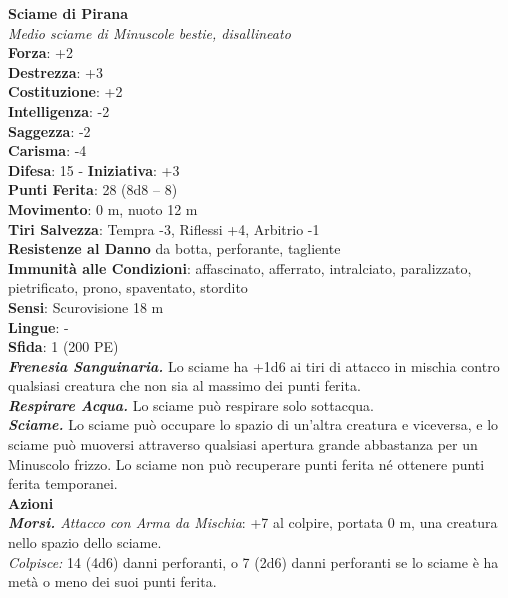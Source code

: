 \begin{multicols}{2}
\medskip\textbf{Sciame di Pirana}\\
\emph{Medio sciame di Minuscole bestie, disallineato}\\
\textbf{Forza}: +2\\
\textbf{Destrezza}: +3\\
\textbf{Costituzione}: +2\\
\textbf{Intelligenza}: -2\\
\textbf{Saggezza}: -2\\
\textbf{Carisma}: -4\\
\textbf{Difesa}: 15 - \textbf{Iniziativa}: +3\\
\textbf{Punti Ferita}: 28 (8d8 -- 8)\\
\textbf{Movimento}: 0 m, nuoto 12 m\\
\textbf{Tiri Salvezza}: Tempra -3, Riflessi +4, Arbitrio -1\\
\textbf{Resistenze al Danno} da botta, perforante, tagliente\\
\textbf{Immunità alle Condizioni}: affascinato, afferrato, intralciato, paralizzato, pietrificato, prono, spaventato, stordito\\
\textbf{Sensi}: Scurovisione 18 m\\
\textbf{Lingue}: -\\
\textbf{Sfida}: 1 (200 PE)\smallskip\\
\emph{\textbf{Frenesia Sanguinaria.}} Lo sciame ha +1d6 ai tiri di attacco in mischia contro qualsiasi creatura che non sia al massimo dei punti ferita.\\
\emph{\textbf{Respirare Acqua.}} Lo sciame può respirare solo sottacqua.\\
\emph{\textbf{Sciame.}} Lo sciame può occupare lo spazio di un'altra creatura e viceversa, e lo sciame può muoversi attraverso qualsiasi apertura grande abbastanza per un Minuscolo frizzo. Lo sciame non può recuperare punti ferita né ottenere punti ferita temporanei.\\
\smallskip\textbf{Azioni}\\
\emph{\textbf{Morsi.} Attacco con Arma da Mischia}: +7 al colpire, portata 0 m, una creatura nello spazio dello sciame.\\
\emph{Colpisce:} 14 (4d6) danni perforanti, o 7 (2d6) danni perforanti se lo sciame è ha metà o meno dei suoi punti ferita.\\


\end{multicols}
